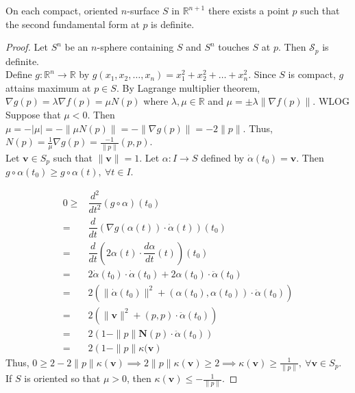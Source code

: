 \begin{theorem}
	On each compact, oriented $n$-surface $S$ in $\mathbb{R}^{n+1}$ there exists a point $p$ such that the second fundamental form at $p$ is definite.
\end{theorem}
\begin{proof}
	Let $S^n$ be an $n$-sphere containing $S$ and $S^n$ touches $S$ at $p$. Then $\mathscr{S}_p$ is definite.\\

	Define $g : \mathbb{R}^n \to \mathbb{R}$ by $g(x_1,x_2,\dots, x_n) = x_1^2 + x_2^2 + \dots + x_n^2$. Since $S$ is compact, $g$ attains maximum at $p \in S$. By Lagrange multiplier theorem, $\nabla g(p) = \lambda \nabla f(p) = \mu N(p)$ where $\lambda,\mu \in \mathbb{R}$ and $\mu = \pm \lambda \|\nabla f(p) \|$. WLOG Suppose that $\mu < 0$. Then $\mu = -|\mu| = -\|\mu N(p) \| = -\| \nabla g(p) \| = -2\|p\|$. Thus, $N(p) = \frac{1}{\mu} \nabla g(p) = \frac{-1}{\| p \|} (p,p)$. \\

	Let $\mathbf{v} \in S_p$ such that $\| \mathbf{v} \| = 1$. Let $\alpha : I \to S$ defined by $\dot{\alpha}(t_0) = \mathbf{v}$. Then $g \circ \alpha(t_0) \ge g \circ \alpha(t),\ \forall t \in I$.

\begingroup
\allowdisplaybreaks
	\begin{align*}
		0 \ge & \dfrac{d^2}{dt^2} \left( g \circ \alpha \right)(t_0) \\
		= & \dfrac{d}{dt} \left( \nabla g(\alpha(t)) \cdot \dot{\alpha}(t) \right)(t_0) \\
		= & \dfrac{d}{dt} \left( 2\alpha(t) \cdot \dfrac{d\alpha}{dt} (t) \right)(t_0) \\
		= & 2\dot{\alpha}(t_0) \cdot \dot{\alpha}(t_0) + 2 \alpha(t_0) \cdot \ddot{\alpha}(t_0)\\
		= & 2 \left( \| \dot{\alpha}(t_0)\|^2 + (\alpha(t_0),\alpha(t_0)) \cdot \ddot{\alpha}(t_0) \right) \\
		= & 2 \left( \| \mathbf{v} \|^2 + (p,p) \cdot \ddot{\alpha}(t_0) \right)\\
		= & 2\left( 1-\|p\|\mathbf{N}(p) \cdot \ddot{\alpha}(t_0) \right)\\
		= & 2\left( 1-\|p\| \kappa(\mathbf{v} \right)
	\end{align*}
\endgroup
	Thus, $0 \ge 2-2\|p\|\kappa(\mathbf{v}) \implies 2\|p\|\kappa(\mathbf{v}) \ge 2 \implies \kappa(\mathbf{v}) \ge \frac{1}{\|p\|},\ \forall \mathbf{v} \in S_p$. If $S$ is oriented so that $\mu > 0$, then $\kappa(\mathbf{v}) \le -\frac{1}{\|p\|}$.
\end{proof}

